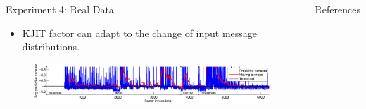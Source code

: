 \documentclass[english]{beamer}
\begin{document}
\begin{frame}
\begin{columns}[t]
\begin{block}{ Experiment 4: Real Data}
\begin{figure}[ht]
  \centering
  \label{fig:uci_performance}
\end{figure}

\begin{itemize}
    \item KJIT factor can adapt to the change of input message distributions.
\end{itemize}

\begin{figure}
\centering
\includegraphics[width=0.99\textwidth]{online/uci_temporal_uncertainty-crop}
\end{figure}

\end{block}



\begin{block}{References}


\end{block}
\end{columns}
\end{frame}
\end{document}
